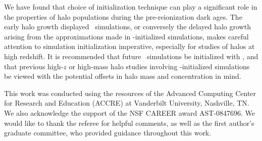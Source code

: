 We have found that choice of initialization technique can play a significant role in the properties of halo populations during the pre-reionization dark ages.  The early halo growth displayed \lpt\ simulations, or conversely the delayed halo growth arising from the approximations made in \za-initialized simulations, makes careful attention to simulation initialization imperative, especially for studies of halos at high redshift.  It is recommended that future \nbody\ simulations be initialized with \lpt, and that previous high-$z$ or high-mass halo studies involving \za-initialized simulations be viewed with the potential offsets in halo mass and concentration in mind.

This work was conducted using the resources of the Advanced Computing Center for Research and Education (ACCRE) at Vanderbilt University, Nashville, TN.  We also acknowledge the support of the NSF CAREER award AST-0847696.  We would like to thank the referee for helpful comments, as well as the first author's graduate committee, who provided guidance throughout this work.




